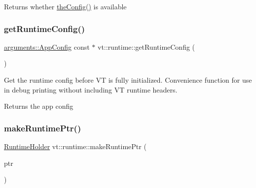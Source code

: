 \begin{DoxyReturn}{Returns}
whether {\ttfamily \hyperlink{namespacevt_aa17c6eae35e7e41a8b11d4047b7c0839}{the\+Config()}} is available 
\end{DoxyReturn}
\mbox{\label{namespacevt_1_1runtime_a8dfbd8b00276c812dc7646cf658cc95d}} 
\subsubsection{\texorpdfstring{get\+Runtime\+Config()}{getRuntimeConfig()}}
{\footnotesize\ttfamily \hyperlink{structvt_1_1arguments_1_1_app_config}{arguments\+::\+App\+Config} const  $\ast$ vt\+::runtime\+::get\+Runtime\+Config (\begin{DoxyParamCaption}{ }\end{DoxyParamCaption})}



Get the runtime config before VT is fully initialized. Convenience function for use in debug printing without including VT runtime headers. 

\begin{DoxyReturn}{Returns}
the app config 
\end{DoxyReturn}
\mbox{\label{namespacevt_1_1runtime_a71998fecf2a4d70b11e3ae4aa47810db}} 
\subsubsection{\texorpdfstring{make\+Runtime\+Ptr()}{makeRuntimePtr()}}
{\footnotesize\ttfamily \hyperlink{structvt_1_1runtime_1_1_runtime_holder}{Runtime\+Holder} vt\+::runtime\+::make\+Runtime\+Ptr (\begin{DoxyParamCaption}\item[{\hyperlink{structvt_1_1runtime_1_1_runtime_holder_a9740e8aa7487fcf38b67a7e160d7b046}{Runtime\+Holder\+::\+Pointer\+Type} const}]{ptr }\end{DoxyParamCaption})\hspace{0.3cm}{\ttfamily [inline]}}

